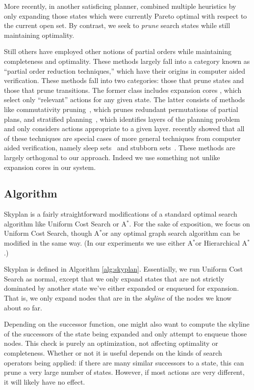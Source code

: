 \documentclass[letterpaper]{article}
\theoremstyle{plain} \newtheorem{theorem}{Theorem} \newtheorem{proposition}{Proposition} \newtheorem{lemma}{Lemma}
\theoremstyle{definition} \newtheorem{definition}{Definition} \newtheorem{conjecture}{Conjecture} \newtheorem*{example}{Example}
\theoremstyle{remark} \newtheorem*{remark}{Remark} \newtheorem*{note}{Note} \newtheorem{case}{Case}
\newcommand{\Astar}{A$^*$}
\begin{document}
More recently, in another satisficing planner, \citet{roger2010more}
combined multiple heuristics by only expanding those states which
were currently Pareto optimal with respect to the current open set.
By contrast, we seek to \textit{prune} search states while still
maintaining optimality.

Still others have employed other notions of partial orders while
maintaining completeness and optimality. These methods largely fall
into a category known as ``partial order reduction techniques,''
which have their origins in computer aided verification. These
methods fall into two categories: those that prune states and those
that prune transitions.  The former class includes expansion cores
\citep{chen09completeness, xu11theory}, which select only ``relevant''
actions for any given state. The latter consists of methods like
commutativity pruning~\citep{geffner2000admissible}, which prunes
redundant permutations of partial plans, and stratified
planning~\citep{chen2009stratified}, which identifies layers of the
planning problem and only considers actions appropriate to a given
layer. \citet{wehrle2012partial} recently showed that all of these
techniques are special cases of more general techniques from computer
aided verification, namely sleep sets~\citep{godefroid96partial} and
stubborn sets~\citep{valmari92stubborn}. These methods are largely
orthogonal to our approach. Indeed we use something not unlike
expansion cores in our system.


\subsection{Algorithm}

Skyplan is a fairly straightforward modifications of a standard optimal search
algorithm like Uniform Cost
Search or \Astar. For the sake of exposition, we focus on Uniform
Cost Search, though \Astar or any optimal graph search algorithm can
be modified in the same way. (In our experiments we use either \Astar or Hierarchical \Astar.)

Skyplan is defined in Algorithm \ref{alg:skyplan}. Essentially, we
run Uniform Cost Search as normal, except that we only expand states
that are not strictly dominated by another state we've either
expanded or enqueued for expansion. That is, we only expand nodes
that are in the \textit{skyline} of the nodes we know about so far.

Depending on the successor function, one might also want to compute
the skyline of the successors of the state being expanded and only
attempt to enqueue those nodes.  This check is purely an optimization,
not affecting optimality or completeness. Whether or not it is
useful depends on the kinds of search operators being applied: if
there are many similar successors to a state, this can prune a very large
number of states. However, if most actions are very different, it will
likely have no effect.
\end{document}
